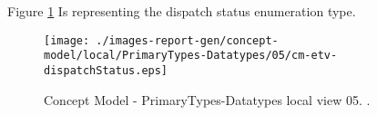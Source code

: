 Figure \ref{fig:lu.uni.lassy.excalibur.group09.spec-CM-view-local-PrimaryTypes-Datatypes-05} Is representing the dispatch status enumeration type.



\begin{figure}[htbp] 
\label{fig:lu.uni.lassy.excalibur.group09.spec-CM}
\begin{center}
\texttt{[image: ./images-report-gen/concept-model/local/PrimaryTypes-Datatypes/05/cm-etv-dispatchStatus.eps]}
\end{center}
\caption[Concept Model - PrimaryTypes-Datatypes local view 05 - ]{Concept Model - PrimaryTypes-Datatypes local view 05. .}
\label{fig:lu.uni.lassy.excalibur.group09.spec-CM-view-local-PrimaryTypes-Datatypes-05}
\end{figure}
\vspace{0.5cm} 
